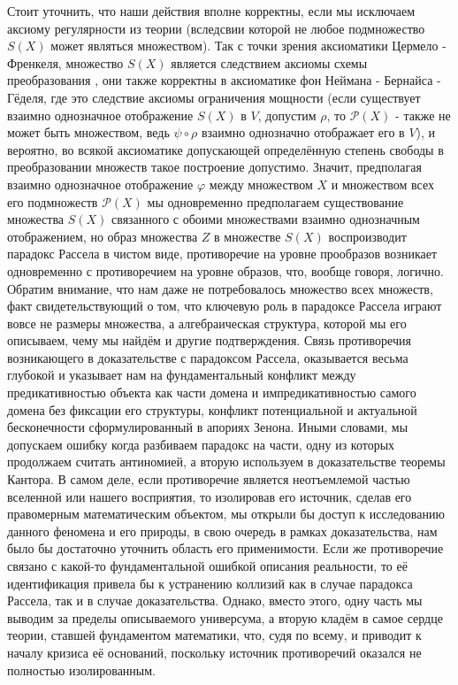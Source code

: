 \documentclass[12pt]{article}
\begin{document}
Стоит уточнить, что наши действия вполне корректны, если мы исключаем аксиому регулярности из теории (вследсвии которой не любое подмножество $S(X)$ может являться множеством). Так с точки зрения аксиоматики Цермело - Френкеля, множество $S(X)$ является следствием аксиомы схемы преобразования \cite{fraenkel-axioms}, они также корректны в аксиоматике фон Неймана - Бернайса - Гёделя, где это следствие аксиомы ограничения мощности \cite{von-neumann-axioms} (если существует взаимно однозначное отображение $S(X)$ в $V$, допустим $\rho$, то $\mathcal{P}(X)$ - также не может быть множеством, ведь $\psi \circ \rho$ взаимно однозначно отображает его в $V$), и вероятно, во всякой аксиоматике допускающей определённую степень свободы в преобразовании множеств такое построение допустимо. Значит, предполагая взаимно однозначное отображение $\varphi$ между множеством $X$ и множеством всех его подмножеств $\mathcal{P}(X)$ мы одновременно предполагаем существование множества $S(X)$ связанного с обоими множествами взаимно однозначным отображением, но образ множества $Z$ в множестве $S(X)$ воспроизводит парадокс Рассела в чистом виде, противоречие на уровне прообразов возникает одновременно с противоречием на уровне образов, что, вообще говоря, логично. Обратим внимание, что нам даже не потребовалось множество всех множеств, факт свидетельствующий о том, что ключевую роль в парадоксе Рассела играют вовсе не размеры множества, а алгебраическая структура, которой мы его описываем, чему мы найдём и другие подтверждения. Связь противоречия возникающего в доказательстве с парадоксом Рассела, оказывается весьма глубокой и указывает нам на фундаментальный конфликт между предикативностью объекта как части домена и импредикативностью самого домена без фиксации его структуры, конфликт потенциальной и актуальной бесконечности сформулированный в апориях Зенона. Иными словами, мы допускаем ошибку когда разбиваем парадокс на части, одну из которых продолжаем считать антиномией, а вторую используем в доказательстве теоремы Кантора. В самом деле, если противоречие является неотъемлемой частью вселенной или нашего восприятия, то изолировав его источник, сделав его правомерным математическим объектом, мы открыли бы доступ к исследованию данного феномена и его природы, в свою очередь в рамках доказательства, нам было бы достаточно уточнить область его применимости. Если же противоречие связано с какой-то фундаментальной ошибкой описания реальности, то её идентификация привела бы к устранению коллизий как в случае парадокса Рассела, так и в случае доказательства. Однако, вместо этого, одну часть мы выводим за пределы описываемого универсума, а вторую кладём в самое сердце теории, ставшей фундаментом математики, что, судя по всему, и приводит к началу кризиса её оснований, поскольку источник противоречий оказался не полностью изолированным. 
\end{document}

